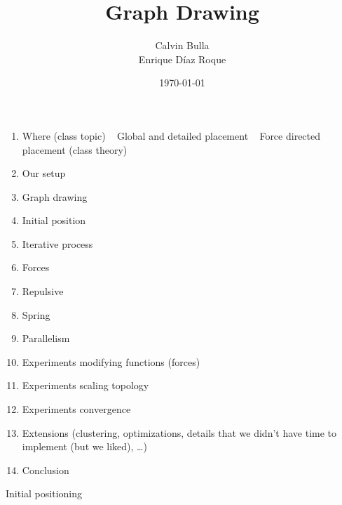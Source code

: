 \documentclass{beamer}
\title{Graph Drawing}
\date{\today}
\author{Calvin Bulla \\ Enrique Díaz Roque}
\institute{Algorithms for VSLI}
\begin{document}
\maketitle

\begin{frame}
\begin {enumerate}
\item Where (class topic) ~ Global and detailed placement ~ Force directed placement (class theory)
\item Our setup
\item Graph drawing
\item Initial position
\item Iterative process
\item Forces
\item Repulsive
\item Spring
\item Parallelism
\item Experiments modifying functions (forces)
\item Experiments scaling topology
\item Experiments convergence
\item Extensions (clustering, optimizations, details that we didn’t have time to implement (but we liked), …)
\item Conclusion
\end{enumerate}
\end{frame}

\begin{frame}{Initial positioning}
\centering
{}

\end{frame}
\end{document}

